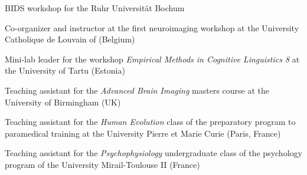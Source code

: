 
BIDS workshop for the Ruhr Universität Bochum

Co-organizer and instructor at the first neuroimaging workshop 
at the University Catholique de Louvain of (Belgium)

Mini-lab leader for the workshop \textit{Empirical Methods in Cognitive Linguistics 8} 
at the University of Tartu (Estonia)

Teaching assistant for the \textit{Advanced Brain Imaging} masters course 
at the University of Birmingham (UK)

Teaching assistant for the \textit{Human Evolution} class of the preparatory program 
to paramedical training at the University Pierre et Marie Curie (Paris, France)

Teaching assistant for the \textit{Psychophysiology} undergraduate class 
of the psychology program of the University Mirail-Toulouse II (France)
